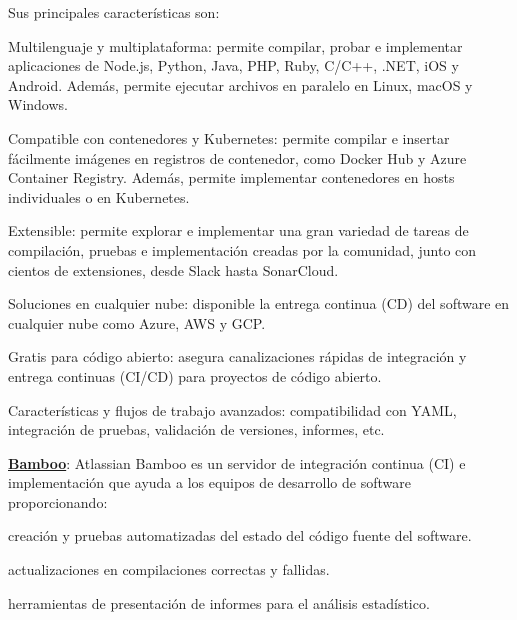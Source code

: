 \begin{compactitem}
    Sus principales características son:
    \begin{compactitem}
        \item Multilenguaje y multiplataforma: permite compilar, probar e implementar aplicaciones de Node.js, Python, Java, PHP, Ruby, C/C++, .NET, iOS y Android. Además, permite ejecutar archivos en paralelo en Linux, macOS y Windows.
        \item Compatible con contenedores y Kubernetes: permite compilar e insertar fácilmente imágenes en registros de contenedor, como Docker Hub y Azure Container Registry. Además, permite implementar contenedores en hosts individuales o en Kubernetes.
        \item Extensible: permite explorar e implementar una gran variedad de tareas de compilación, pruebas e implementación creadas por la comunidad, junto con cientos de extensiones, desde Slack hasta SonarCloud.
        \item Soluciones en cualquier nube: disponible la entrega continua (CD) del software en cualquier nube como Azure, AWS y GCP.
        \item Gratis para código abierto: asegura canalizaciones rápidas de integración y entrega continuas (CI/CD) para proyectos de código abierto.
        \item Características y flujos de trabajo avanzados: compatibilidad con YAML, integración de pruebas, validación de versiones, informes, etc.
    \end{compactitem}
    \item \textbf{\underline{Bamboo}}: Atlassian Bamboo es un servidor de integración continua (CI) e implementación que ayuda a los equipos de desarrollo de software proporcionando:
    \begin{compactitem}
        \item creación y pruebas automatizadas del estado del código fuente del software.
        \item actualizaciones en compilaciones correctas y fallidas.
        \item herramientas de presentación de informes para el análisis estadístico.
    \end{compactitem}


\end{compactitem}
